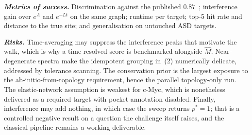 \documentclass[10pt,a4paper]{article}
\newcommand{\Mhat}{\hat{M}}
\newcommand{\lead}[1]{\textbf{\textit{#1}}}
\begin{document}
\lead{Metrics of success.} Discrimination against the published $0.87$~\cite{meller2023};
interference gain over $e^{A}$ and $e^{-Lt}$ on the same graph; runtime per target; top-5 hit rate
and distance to the true site; and generalisation on untouched ASD targets.

\lead{Risks.} Time-averaging may suppress the interference peaks that motivate the walk, which is why
a time-resolved score is benchmarked alongside $\Mhat$. Near-degenerate spectra make the idempotent
grouping in~(2) numerically delicate, addressed by tolerance scanning. The conservation prior is the
largest exposure to the ab-initio-from-topology requirement, hence the parallel topology-only run.
The elastic-network assumption is weakest for c-Myc, which is nonetheless delivered as a required
target with pocket annotation disabled. Finally, interference may add nothing, in which case the
sweep returns $p^{*}=1$; that is a controlled negative result on a question the challenge itself
raises, and the classical pipeline remains a working deliverable.
\end{document}
